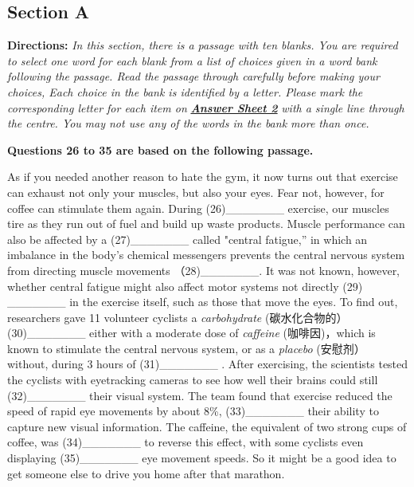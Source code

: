 \documentclass[UTF8,11pt]{ctexart}
\begin{document}
\subsection*{\textbf{Section A}}


\textbf{Directions:}\textit{ In this section, there is a passage with ten blanks. You are required to select one word} \textit{for each blank from a list of choices given in a word bank following the passage. Read the passage} \textit{through carefully before making your choices, Each choice in the bank is identified by a letter. Please} \textit{mark the corresponding letter for each item on}\textbf{\textit{ }}\textbf{\textit{\uline{Answer Sheet 2}}}\textit{ with a single line through the centre. You} \textit{may not use any of the words in the bank more than once.}


\textbf{Questions 26 to 35 are based on the following passage.}


As if you needed another reason to hate the gym, it now turns out that exercise can exhaust not only your muscles, but also your eyes. Fear not, however, for coffee can stimulate them again. During (26)\_\_\_\_\_\_\_ exercise, our muscles tire as they run out of fuel and build up waste products. Muscle performance can also be affected by a (27)\_\_\_\_\_\_\_ called "central fatigue,” in which an imbalance in the body’s chemical messengers prevents the central nervous system from directing muscle movements （28)\_\_\_\_\_\_\_. It was not known, however, whether central fatigue might also affect motor systems not directly (29) \_\_\_\_\_\_\_ in the exercise itself, such as those that move the eyes. To find out, researchers gave 11 volunteer cyclists a\textit{ carbohydrate} (碳水化合物的）(30)\_\_\_\_\_\_\_ either with a moderate dose of \textit{caffeine} (咖啡因)，which is known to stimulate the central nervous system, or as a\textit{ placebo} (安慰剂） without, during 3 hours of (31)\_\_\_\_\_\_\_ . After exercising, the scientists tested the cyclists with eyetracking cameras to see how well their brains could still (32)\_\_\_\_\_\_\_ their visual system. The team found that exercise reduced the speed of rapid eye movements by about 8\%, (33)\_\_\_\_\_\_\_ their ability to capture new visual information. The caffeine, the equivalent of two strong cups of coffee, was (34)\_\_\_\_\_\_\_ to reverse this effect, with some cyclists even displaying (35)\_\_\_\_\_\_\_ eye movement speeds. So it might be a good idea to get someone else to drive you home after that marathon.
\end{document}
